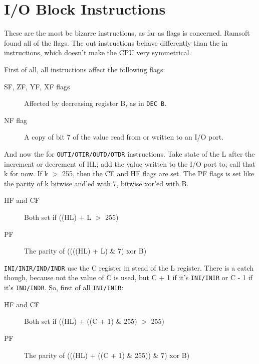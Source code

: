 \documentclass[oneside,a4paper]{book}
\begin{document}
\section{I/O Block Instructions}
\label{block_io}

These are the most be bizarre instructions, as far as flags is concerned. Ramsoft found all of the flags. The out instructions behave differently than the in instructions, which doesn't make the CPU very symmetrical. 

First of all, all instructions affect the following flags:

\begin{description}

	\item[SF, ZF, YF, XF flags]
	Affected by decreasing register B, as in {\tt DEC B}.

	\item[NF flag]
	A copy of bit 7 of the value read from or written to an I/O port.

\end{description}

And now the for {\tt OUTI/OTIR/OUTD/OTDR} instructions. Take state of the L after the increment or decrement of HL; add the value written to the I/O port to; call that k for now. If k $>$ 255, then the CF and HF flags are set. The PF flags is set like the parity of k bitwise and'ed with 7, bitwise xor'ed with B.

\begin{description}

	\item[HF and CF]
	Both set if ((HL) + L  $>$ 255)

	\item[PF]
	The parity of ((((HL) + L) \& 7) xor B)

\end{description}

{\tt INI/INIR/IND/INDR} use the C register in stead of the L register. There is a catch though, because not the value of C is used, but C + 1 if it's {\tt INI/INIR} or C - 1 if it's {\tt IND/INDR}. So, first of all {\tt INI/INIR}:

\begin{description}

	\item[HF and CF]
	Both set if ((HL) + ((C + 1) \& 255)  $>$ 255)

	\item[PF]
	The parity of (((HL) + ((C + 1) \& 255)) \& 7) xor B)

\end{description}
\end{document}
